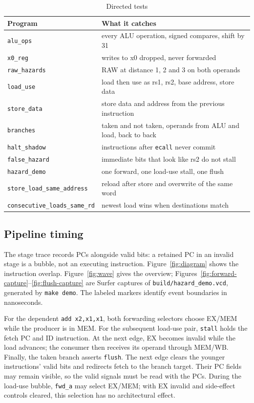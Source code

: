 \begin{table}[t]
\centering
\caption{Directed tests}
\label{tab:tests}
\begin{tabular}{@{}p{}p{}@{}}
\toprule
Program & What it catches \\
\midrule
\texttt{alu\_ops} & every ALU operation, signed compares, shift by 31 \\
\texttt{x0\_reg} & writes to x0 dropped, never forwarded \\
\texttt{raw\_hazards} & RAW at distance 1, 2 and 3 on both operands \\
\texttt{load\_use} & load then use as rs1, rs2, base address, store data \\
\texttt{store\_data} & store data and address from the previous instruction \\
\texttt{branches} & taken and not taken, operands from ALU and load, back to back \\
\texttt{halt\_shadow} & instructions after \texttt{ecall} never commit \\
\texttt{false\_hazard} & immediate bits that look like rs2 do not stall \\
\texttt{hazard\_demo} & one forward, one load-use stall, one flush \\
\texttt{store\_\allowbreak{}load\_\allowbreak{}same\_\allowbreak{}address} & reload after store and overwrite of the same word \\
\texttt{consecutive\_\allowbreak{}loads\_\allowbreak{}same\_\allowbreak{}rd} & newest load wins when destinations match \\
\bottomrule
\end{tabular}
\end{table}

\subsection{Pipeline timing}
The stage trace records PCs alongside valid bits: a retained PC in an
invalid stage is a bubble, not an executing instruction. Figure~\ref{fig:diagram}
shows the instruction overlap. Figure~\ref{fig:wave} gives the overview;
Figures~\ref{fig:forward-capture}--\ref{fig:flush-capture} are Surfer captures
of \texttt{build/hazard\_demo.vcd}, generated by \texttt{make demo}.
The labeled markers identify event boundaries in nanoseconds.

For the dependent \texttt{add x2,x1,x1}, both forwarding selectors choose
EX/MEM while the producer is in MEM. For the subsequent load-use pair,
\texttt{stall} holds the fetch PC and ID instruction. At the next edge,
EX becomes invalid while the load advances; the consumer then receives its
operand through MEM/WB. Finally, the taken branch asserts \texttt{flush}.
The next edge clears the younger instructions' valid bits and redirects
fetch to the branch target. Their PC fields may remain visible, so the
valid signals must be read with the PCs. During the load-use bubble,
\texttt{fwd\_a} may select EX/MEM; with EX invalid and side-effect controls
cleared, this selection has no architectural effect.

